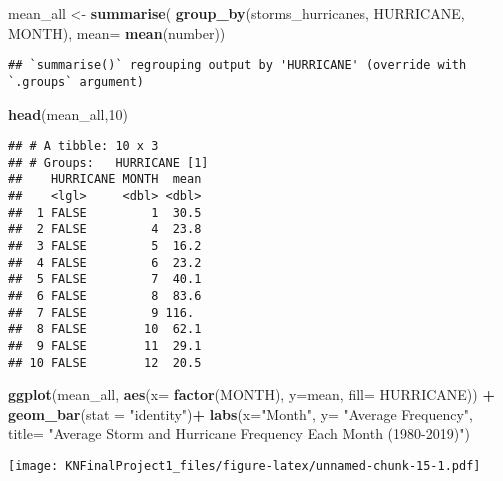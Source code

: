 \documentclass[
]{article}
\newenvironment{Shaded}{\begin{snugshade}}{\end{snugshade}}
\newcommand{\DataTypeTok}[1]{\textcolor[rgb]{0.13,0.29,0.53}{#1}}
\newcommand{\DecValTok}[1]{\textcolor[rgb]{0.00,0.00,0.81}{#1}}
\newcommand{\KeywordTok}[1]{\textcolor[rgb]{0.13,0.29,0.53}{\textbf{#1}}}
\newcommand{\NormalTok}[1]{#1}
\newcommand{\OperatorTok}[1]{\textcolor[rgb]{0.81,0.36,0.00}{\textbf{#1}}}
\newcommand{\StringTok}[1]{\textcolor[rgb]{0.31,0.60,0.02}{#1}}
\begin{document}
\begin{Shaded}
\begin{Highlighting}[]
\NormalTok{mean_all <-}\StringTok{ }\KeywordTok{summarise}\NormalTok{(}
  \KeywordTok{group_by}\NormalTok{(storms_hurricanes, HURRICANE, MONTH),}
  \DataTypeTok{mean=} \KeywordTok{mean}\NormalTok{(number))}
\end{Highlighting}
\end{Shaded}

\begin{verbatim}
## `summarise()` regrouping output by 'HURRICANE' (override with `.groups` argument)
\end{verbatim}

\begin{Shaded}
\begin{Highlighting}[]
\KeywordTok{head}\NormalTok{(mean_all,}\DecValTok{10}\NormalTok{)}
\end{Highlighting}
\end{Shaded}

\begin{verbatim}
## # A tibble: 10 x 3
## # Groups:   HURRICANE [1]
##    HURRICANE MONTH  mean
##    <lgl>     <dbl> <dbl>
##  1 FALSE         1  30.5
##  2 FALSE         4  23.8
##  3 FALSE         5  16.2
##  4 FALSE         6  23.2
##  5 FALSE         7  40.1
##  6 FALSE         8  83.6
##  7 FALSE         9 116. 
##  8 FALSE        10  62.1
##  9 FALSE        11  29.1
## 10 FALSE        12  20.5
\end{verbatim}

\begin{Shaded}
\begin{Highlighting}[]
\KeywordTok{ggplot}\NormalTok{(mean_all, }\KeywordTok{aes}\NormalTok{(}\DataTypeTok{x=} \KeywordTok{factor}\NormalTok{(MONTH), }\DataTypeTok{y=}\NormalTok{mean, }\DataTypeTok{fill=}\NormalTok{ HURRICANE)) }\OperatorTok{+}\StringTok{ }
\StringTok{  }\KeywordTok{geom_bar}\NormalTok{(}\DataTypeTok{stat =} \StringTok{"identity"}\NormalTok{)}\OperatorTok{+}
\StringTok{  }\KeywordTok{labs}\NormalTok{(}\DataTypeTok{x=}\StringTok{"Month"}\NormalTok{, }\DataTypeTok{y=} \StringTok{"Average Frequency"}\NormalTok{, }\DataTypeTok{title=} \StringTok{"Average Storm and Hurricane Frequency Each Month (1980-2019)"}\NormalTok{)}
\end{Highlighting}
\end{Shaded}

\texttt{[image: KNFinalProject1\_files/figure-latex/unnamed-chunk-15-1.pdf]}
\end{document}
